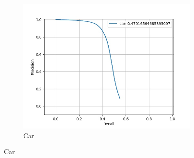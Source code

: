 \begin{figure}
\begin{subfigure}[t]{0.325\textwidth}
    		\includegraphics[width=\textwidth]{images/tuned_pr/class_car_pr.jpg}
    		\caption{Car}
    	\end{subfigure}
        

\end{figure}
